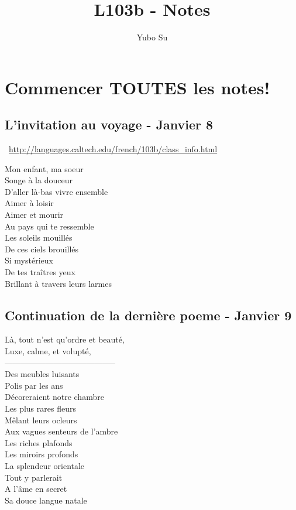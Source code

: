\documentclass{report}
\begin{document}
\title{L103b - Notes}
\author{Yubo Su}
\date{ }

\maketitle

\tableofcontents

\chapter{Commencer TOUTES les notes!}

\section{L'invitation au voyage - Janvier 8}
	\
\url{http://languages.caltech.edu/french/103b/class_info.html}

\begin{center}
Mon enfant, ma soeur\\
Songe \`a la douceur\\
D'aller l\`a-bas vivre ensemble\\
Aimer \`a loisir\\
Aimer et mourir\\
Au pays qui te ressemble\\
Les soleils mouill\'es\\
De ces ciels brouill\'es\\
Si myst\'erieux\\
De tes tra\^itres yeux\\
Brillant \`a travers leurs larmes
\end{center}

\section{Continuation de la derni\`ere poeme - Janvier 9}

\begin{center}
L\`a, tout n'est qu'ordre et beaut\'e,\\
Luxe, calme, et volupt\'e,\\
-----------------------------------------\\
Des meubles luisants\\
Polis par les ans\\
D\'ecoreraient notre chambre\\
Les plus rares fleurs\\
M\^elant leurs ocleurs\\
Aux vagues senteurs de l'ambre\\
Les riches plafonds\\
Les miroirs profonds\\
La splendeur orientale\\
Tout y parlerait\\
A l'\^ame en secret\\
Sa douce langue natale\\
\end{center}
\end{document}
